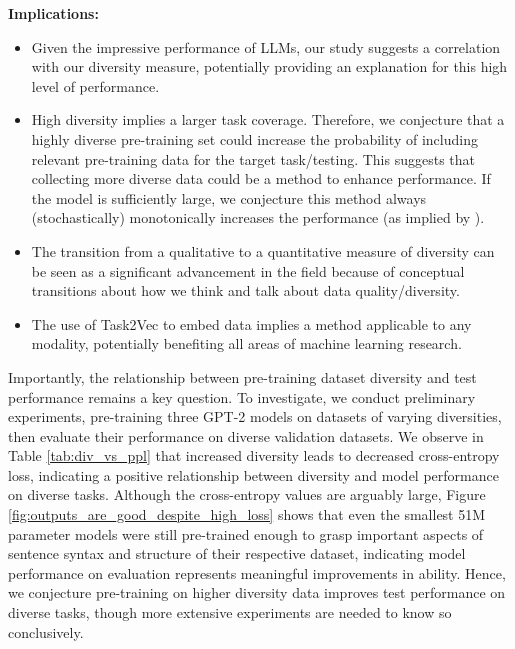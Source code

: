 \textbf{Implications:}
\begin{itemize}
    \item Given the impressive performance of LLMs, our study suggests a correlation with our diversity measure, potentially providing an explanation for this high level of performance.
    \item High diversity implies a larger task coverage. 
    Therefore, we conjecture that a highly diverse pre-training set could increase the probability of including relevant pre-training data for the target task/testing.
    This suggests that collecting more diverse data could be a method to enhance performance.
    If the model is sufficiently large, we conjecture this method always (stochastically) monotonically increases the performance (as implied by \citep{zhang2021understanding}).
    \item The transition from a qualitative to a quantitative measure of diversity can be seen as a significant advancement in the field because of conceptual transitions about how we think and talk about data quality/diversity.
    \item The use of Task2Vec to embed data implies a method applicable to any modality, potentially benefiting all areas of machine learning research.
\end{itemize}

Importantly, the relationship between pre-training dataset diversity and test performance remains a key question.
To investigate, we conduct preliminary experiments, pre-training three GPT-2 models on datasets of varying diversities, then evaluate their performance on diverse validation datasets.
We observe in Table \ref{tab:div_vs_ppl} that increased diversity leads to decreased cross-entropy loss, indicating a positive relationship between diversity and model performance on diverse tasks. Although the cross-entropy values are arguably large, Figure \ref{fig:outputs_are_good_despite_high_loss} shows that even the smallest 51M parameter models were still pre-trained enough to grasp important aspects of sentence syntax and structure of their respective dataset, indicating model performance on evaluation represents meaningful improvements in ability. 
Hence, we conjecture pre-training on higher diversity data improves test performance on diverse tasks, though more extensive experiments are needed to know so conclusively.

